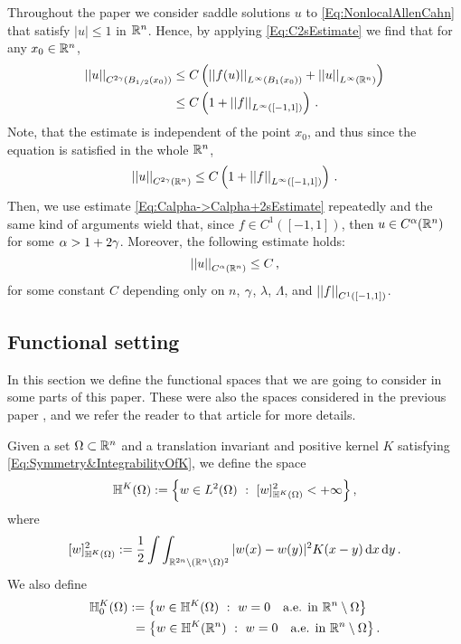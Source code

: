 Throughout the paper we consider saddle solutions $u$ to \eqref{Eq:NonlocalAllenCahn} that satisfy $|u|\leq 1$ in $\mathbb{R}^n$. Hence, by applying \eqref{Eq:C2sEstimate} we find that for any $x_0\in \mathbb{R}^n$,
\begin{align*}
\left | \left |{u} \right | \right |_{C^{2\gamma} (B_{1/2} (x_0))} &\leq C\left ( {\left | \left |{f(u)} \right | \right |_{L^\infty (B_1(x_0))} + \left | \left |{u} \right | \right |_{L^\infty  (\mathbb{R}^n)} }\right ) \\
&\leq C\left ( {1 + \left | \left |{f} \right | \right |_{L^\infty ([-1,1])} }\right )\,.
\end{align*}
Note, that the estimate is independent of the point $x_0$, and thus since the equation is satisfied in the whole $\mathbb{R}^n$,
$$
\left | \left |{u} \right | \right |_{C^{2\gamma}(\mathbb{R}^n)} \leq C\left ( {1 + \left | \left |{f} \right | \right |_{L^\infty ([-1,1])} }\right )\,.
$$
Then, we use estimate \eqref{Eq:Calpha->Calpha+2sEstimate} repeatedly and the same kind of arguments wield that, since $f\in C^{1}([-1,1])$, then $u\in C^{\alpha}(\mathbb{R}^n)$ for some $\alpha > 1+ 2 \gamma$. Moreover, the following estimate holds:
$$
\left | \left |{u} \right | \right |_{C^{\alpha}(\mathbb{R}^n)} \leq C\,,
$$
for some constant $C$ depending only on $n$, $\gamma$, $\lambda$, $\Lambda$, and $\left | \left |{f} \right | \right |_{C^1([-1,1])}$.


\subsection{Functional setting}
\label{Subsec:Functional setting}



In this section we define the functional spaces that we are going to consider in some parts of this paper. These were also the spaces considered in the previous paper \cite{FelipeSanz-Perela:IntegroDifferentialI}, and we refer the reader to that article for more details.

Given a set $\Omega \subset \mathbb{R}^n$ and a translation invariant and positive kernel $K$ satisfying \eqref{Eq:Symmetry&IntegrabilityOfK}, we define the space
$$
\mathbb{H}^K(\Omega) := \left \{ w \in L^2(\Omega) \ : \ [w]^2_{\mathbb{H}^K(\Omega)} < + \infty \right \},
$$
where
$$
[w]^2_{\mathbb{H}^K(\Omega)} := \dfrac{1}{2}\int\int_{\mathbb{R}^{2n} \setminus (\mathbb{R}^n\setminus\Omega)^2} |w(x) - w(y)|^2 K(x-y) \,\mathrm{d} x \,\mathrm{d} y\,.
$$
We also define
\begin{align*}
\mathbb{H}^K_0(\Omega) &:= \left \{ w \in \mathbb{H}^K(\Omega) \ : \  w = 0 \quad \textrm{a.e. in } \mathbb{R}^n \setminus \Omega \right \} \\
&\ = \left \{ w \in \mathbb{H}^K(\mathbb{R}^n) \ : \  w = 0 \quad \textrm{a.e. in } \mathbb{R}^n \setminus \Omega \right \}.
\end{align*}


